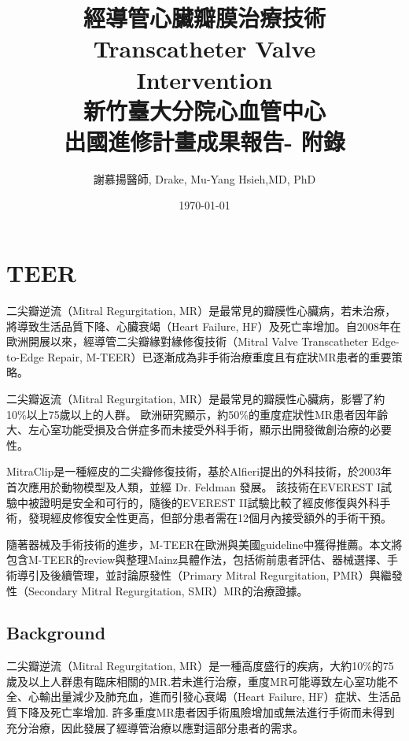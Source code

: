 \documentclass[nols]{tufte-book}
\begin{document}


\title[Structural Heart Disease Intervention]{
\logos
\textbf{經導管心臟瓣膜治療技術\\
Transcatheter Valve\\ Intervention\\
新竹臺大分院心血管中心 \\ 
出國進修計畫成果報告- 附錄}}
\author{謝慕揚醫師, Drake, Mu-Yang Hsieh,MD, PhD}
\date{\today}


\tableofcontents

\onehalfspacing



\chapter{TEER}


二尖瓣逆流（Mitral Regurgitation, MR）是最常見的瓣膜性心臟病，若未治療，將導致生活品質下降、心臟衰竭（Heart Failure, HF）及死亡率增加。自2008年在歐洲開展以來，經導管二尖瓣緣對緣修復技術（Mitral Valve Transcatheter Edge-to-Edge Repair, M-TEER）已逐漸成為非手術治療重度且有症狀MR患者的重要策略。

二尖瓣返流（Mitral Regurgitation, MR）是最常見的瓣膜性心臟病，影響了約10\%以上75歲以上的人群。
歐洲研究顯示，約50\%的重度症狀性MR患者因年齡大、左心室功能受損及合併症多而未接受外科手術，顯示出開發微創治療的必要性。\cite{Puls2016}

MitraClip是一種經皮的二尖瓣修復技術，基於Alfieri提出的外科技術，於2003年首次應用於動物模型及人類，並經 Dr. Feldman 發展。
該技術在EVEREST I試驗中被證明是安全和可行的，隨後的EVEREST II試驗比較了經皮修復與外科手術，發現經皮修復安全性更高，但部分患者需在12個月內接受額外的手術干預。\cite{Feldman2005}

隨著器械及手術技術的進步，M-TEER在歐洲與美國guideline中獲得推薦。本文將包含M-TEER的review與整理Mainz具體作法，包括術前患者評估、器械選擇、手術導引及後續管理，並討論原發性（Primary Mitral Regurgitation, PMR）與繼發性（Secondary Mitral Regurgitation, SMR）MR的治療證據。


\section{Background}
二尖瓣逆流（Mitral Regurgitation, MR）是一種高度盛行的疾病，大約10\%的75歲及以上人群患有臨床相關的MR\cite{Hausleiter2023, Hausleiter2023a}.若未進行治療，重度MR可能導致左心室功能不全、心輸出量減少及肺充血，進而引發心衰竭（Heart Failure, HF）症狀、生活品質下降及死亡率增加.\cite{Goel2014} 許多重度MR患者因手術風險增加或無法進行手術而未得到充分治療，因此發展了經導管治療以應對這部分患者的需求。\cite{Nkomo2006}
\end{document}
